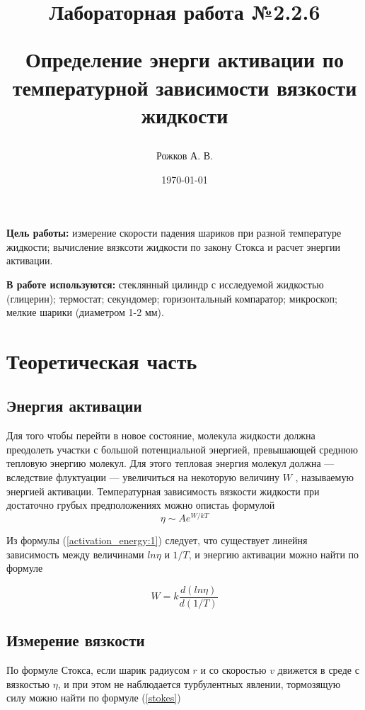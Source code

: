 \documentclass[a4paper, 12pt]{article}
\title{\begin{center}Лабораторная работа №2.2.6\end{center}
Определение энерги активации по температурной зависимости вязкости жидкости}
\author{Рожков А. В.}
\date{\today}
\begin{document}
    \maketitle
    \newpage


    \textbf{Цель работы:} измерение скорости падения шариков при разной температуре жидкости; вычисление вязксоти жидкости по закону Стокса и расчет энергии активации.

    \textbf{В работе используются:} стеклянный цилиндр с исследуемой жидкостью (глицерин); термостат; секундомер; горизонтальный компаратор; микроскоп; мелкие шарики (диаметром 1-2 мм).

    \section{Теоретическая часть}
    \subsection{Энергия активации}
    Для того чтобы перейти в новое состояние, молекула жидкости должна преодолеть участки с большой потенциальной энергией, превышающей среднюю тепловую энергию молекул. Для этого тепловая энергия молекул должна — вследствие флуктуации — увеличиться на некоторую величину $W$ , называемую энергией активации. Температурная зависимость вязкости жидкости при достаточно грубых предположениях можно опистаь формулой
    \begin{equation} \label{activation_energy:1}
        \eta \sim A e^{W/kT}
    \end{equation}

    Из формулы (\ref{activation_energy:1}) следует, что существует линейня зависимость между величинами $ln\eta$ и $1/T$, и энергию активации можно найти по формуле

    \begin{equation} \label{activation_energy:2}
        W = k \frac{d(ln\eta)}{d(1/T)}
    \end{equation}

    \subsection{Измерение вязкости}
    По формуле Стокса, если шарик радиусом $r$ и со скоростью $v$ движется в среде с вязкостью $\eta$, и при этом не наблюдается турбулентных явлении, тормозящую силу можно найти по формуле (\ref{stokes})
\end{document}
